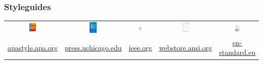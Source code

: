 \documentclass[aspectratio=169, 10pt]{beamer}
\begin{document}
\begin{frame}[fragile]
    \frametitle{Styleguides}
    \begin{tabularx}{\textwidth}{@{}C@{}C@{}C@{}C@{}C@{}}
        \includegraphics[width=0.125\textwidth]{images/styleguides/apa}  &
        \includegraphics[width=0.125\textwidth]{images/styleguides/cmos} &
        \includegraphics[width=0.125\textwidth]{images/styleguides/ieee} &
        \includegraphics[width=0.125\textwidth]{images/styleguides/din}  &
        \includegraphics[width=0.125\textwidth]{images/styleguides/iso}    \\[-2ex]
        \tiny\url{apastyle.apa.org}                                      &
        \tiny\url{press.uchicago.edu}                                    &
        \tiny\url{ieee.org}                                              &
        \tiny\url{webstore.ansi.org}                                     &
        \tiny\url{en-standard.eu}
    \end{tabularx}


\end{frame}
\end{document}
